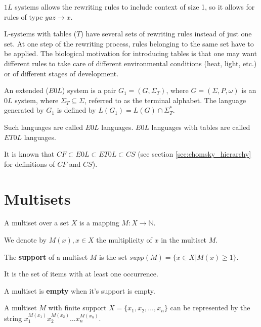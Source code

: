 $1L$ systems allows the rewriting rules to include context of size 1, so it allows for rules of type $yaz\rightarrow x$.

L-systems with tables ($T$) have several sets of rewriting rules instead of just one set. At one step of the rewriting process, rules belonging to the same set have to be applied. The biological motivation for introducing tables is that one may want different rules to take care of different environmental conditions (heat, light, etc.) or of different stages of development.

\begin{definition}
An extended ($E0L$) system is a pair $G_1 = (G, \Sigma_T)$, where $G = (\Sigma, P, \omega)$ is an $0L$ system, where $\Sigma_T \subseteq \Sigma$, referred to as the terminal alphabet. The language generated by $G_1$ is defined by $L(G_1) = L(G)\cap \Sigma_T^*$.
\end{definition}

Such languages are called $E0L$ languages. $E0L$ languages with tables are called $ET0L$ languages.

It is known that $CF \subset E0L \subset ET0L \subset CS$ (see section \ref{sec:chomsky_hierarchy} for definitions of $CF$ and $CS$).



\section{Multisets} %
\label{sec:multisets}

\begin{definition}
A multiset over a set $X$ is a mapping $M: X\rightarrow \mathbb N$.
\end{definition}

We denote by $M(x), x\in X$ the multiplicity of $x$ in the multiset $M$.

\begin{definition}
The {\bf support} of a multiset $M$ is the set $supp(M)=\{x\in X|M(x)\geq 1\}$.
\end{definition}

It is the set of items with at least one occurrence.

\begin{definition}
A multiset is {\bf empty} when it's support is empty.
\end{definition}

A multiset $M$ with finite support $X = \{x_1, x_2, \dots, x_n\}$ can be represented by the string $x_1^{M(x_1)}x_2^{M(x_2)}\dots x_n^{M(x_n)}$.

